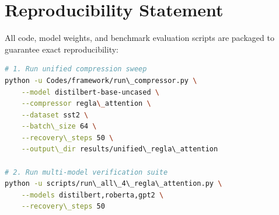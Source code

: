 \section{Reproducibility Statement}
All code, model weights, and benchmark evaluation scripts are packaged to guarantee exact reproducibility:
\begin{lstlisting}[language=bash]
# 1. Run unified compression sweep
python -u Codes/framework/run\_compressor.py \
    --model distilbert-base-uncased \
    --compressor regla\_attention \
    --dataset sst2 \
    --batch\_size 64 \
    --recovery\_steps 50 \
    --output\_dir results/unified\_regla\_attention

# 2. Run multi-model verification suite
python -u scripts/run\_all\_4\_regla\_attention.py \
    --models distilbert,roberta,gpt2 \
    --recovery\_steps 50
\end{lstlisting}

